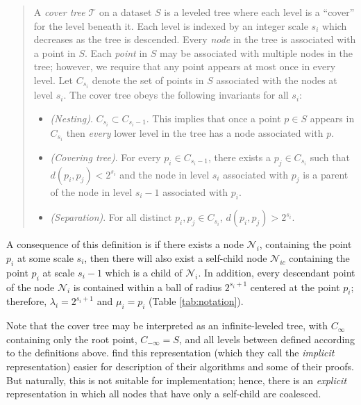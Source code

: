 \begin{quote}
A {\it cover tree} $\mathscr{T}$ on a dataset $S$ is a leveled tree where each
level is a ``cover'' for the level beneath it.  Each level is indexed by an
integer scale $s_i$ which decreases as the tree is descended.  Every {\it node}
in the tree is associated with a point in $S$.  Each {\it point} in $S$ may be
associated with multiple nodes in the tree; however, we require that any point
appears at most once in every level.  Let $C_{s_i}$ denote the set of points in
$S$ associated with the nodes at level $s_i$.  The cover tree obeys the
following invariants for all $s_i$:

\begin{itemize}
  \item {\em (Nesting)}. $C_{s_i} \subset C_{s_i - 1}$.  This implies that once a
point $p \in S$ appears in $C_{s_i}$ then {\it every} lower level in the tree
has a node associated with $p$.

  \item {\em (Covering tree)}. For every $p_i \in C_{s_i - 1}$, there exists a
$p_j \in C_{s_i}$ such that $d(p_i, p_j) < 2^{s_i}$ and the node in level $s_i$
associated with $p_j$ is a parent of the node in level $s_i - 1$ associated with
$p_i$.

  \item {\em (Separation)}.  For all distinct $p_i, p_j \in C_{s_i}$, $d(p_i,
p_j) > 2^{s_i}$.
\end{itemize}
\end{quote}

A consequence of this definition is if there exists a node $\mathscr{N}_i$,
containing the point $p_i$ at some scale $s_i$, then there will also exist a
self-child node $\mathscr{N}_{ic}$ containing the point $p_i$ at scale $s_i - 1$
which is a child of $\mathscr{N}_i$.  In addition, every descendant point of the
node $\mathscr{N}_i$ is contained within a ball of radius $2^{s_i + 1}$ centered
at the point $p_i$; therefore, $\lambda_i = 2^{s_i + 1}$ and $\mu_i = p_i$
(Table \ref{tab:notation}).

Note that the cover tree may be interpreted as an infinite-leveled tree, with
$C_{\infty}$ containing only the root point, $C_{-\infty} = S$, and all levels
between defined according to the definitions above.  \citep{langford2006} find
this representation (which they call the {\it implicit} representation) easier
for description of their algorithms and some of their proofs.  But naturally,
this is not suitable for implementation; hence, there is an {\it explicit}
representation in which all nodes that have only a self-child are coalesced.

